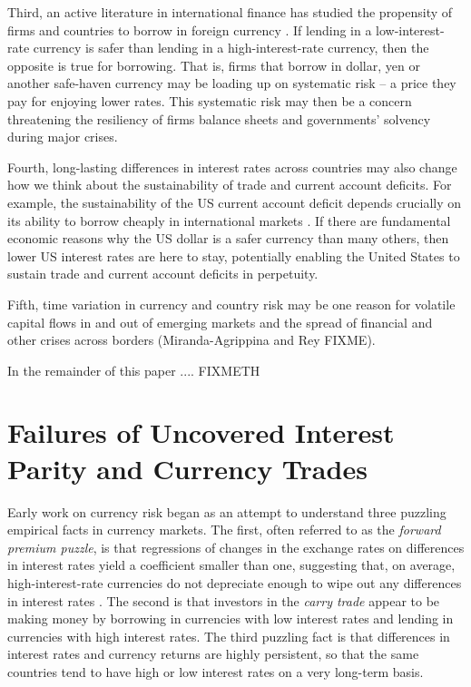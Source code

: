 \documentclass{ar-1col}
\begin{document}
Third, an active literature in international finance has studied the propensity of firms and countries to borrow in foreign currency \citep{DuSchreger2016, KalemliOzcanetal2019}. If lending in a low-interest-rate currency is safer than lending in a high-interest-rate currency, then the opposite is true for borrowing. That is, firms that borrow in dollar, yen or another safe-haven currency may be loading up on systematic risk -- a price they pay for enjoying lower rates. This systematic risk may then be a concern threatening the resiliency of firms balance sheets and governments' solvency during major crises.

Fourth, long-lasting differences in interest rates across countries may also change how we think about the sustainability of trade and current account deficits. For example, the sustainability of the US current account deficit depends crucially on its ability to borrow cheaply in international markets \citep{GourinchasRey2007}. If there are fundamental economic reasons why the US dollar is a safer currency than many others, then lower US interest rates are here to stay, potentially enabling the United States to sustain trade and current account deficits in perpetuity.

Fifth, time variation in currency and country risk may be one reason for volatile capital flows in and out of emerging markets and the spread of financial and other crises across borders (Miranda-Agrippina and Rey FIXME).

In the remainder of this paper .... FIXMETH


\section{Failures of
  Uncovered Interest Parity and Currency Trades}

Early work on currency risk began as an attempt to understand three puzzling empirical facts in currency markets. The first, often referred to as the \textit{forward premium puzzle}, is that regressions of changes in the exchange rates on differences in interest rates yield a coefficient smaller than one, suggesting that, on average, high-interest-rate currencies do not depreciate enough to wipe out any differences in interest rates \citep{Bilson1981, Fama1984}. The second is that investors in the \textit{carry trade} appear to be making money by borrowing in currencies with low interest rates and lending in currencies with high interest rates. The third puzzling fact is that differences in interest rates and currency returns are highly persistent, so that the same countries tend to have high or low interest rates on a very long-term basis.
\end{document}
